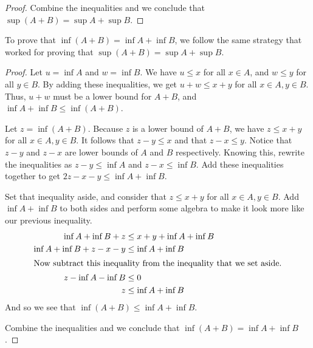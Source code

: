 \documentclass[12pt]{article}
\begin{document}
\begin{flushleft}
\begin{proof}
Combine the inequalities and we conclude that $\sup\left(A + B\right) = \sup A + \sup B$.
\end{proof}

To prove that $\inf\left(A + B\right) = \inf A + \inf B$, we follow the same strategy that worked for proving that $\sup\left(A + B\right) = \sup A + \sup B$.

\begin{proof}
Let $u = \inf A$ and $w = \inf B$. We have $u \leq x$ for all $x \in A$, and $w \leq y$ for all $y \in B$. By adding these inequalities, we get $u + w \leq x + y$ for all $x \in A, y \in B$. Thus, $u + w$ must be a lower bound for $A + B$, and $\inf A + \inf B \leq \inf\left(A + B\right)$.

Let $z = \inf\left(A + B\right)$. Because $z$ is a lower bound of $A + B$, we have $z \leq x + y$ for all $x \in A, y \in B$. It follows that $z - y \leq x$ and that $z - x \leq y$. Notice that $z - y$ and $z - x$ are lower bounds of $A$ and $B$ respectively. Knowing this, rewrite the inequalities as $z - y \leq \inf A$ and $z - x \leq \inf B$. Add these inequalities together to get $2 z - x - y \leq \inf A + \inf B$.

Set that inequality aside, and consider that $z \leq x + y$ for all $x \in A, y \in B$. Add $\inf A + \inf B$ to both sides and perform some algebra to make it look more like our previous inequality.
\begin{align*}
\inf A + \inf B + z &\leq x + y + \inf A + \inf B\\
\inf A + \inf B + z - x - y &\leq \inf A + \inf B\\
\intertext{Now subtract this inequality from the inequality that we set aside.}
z - \inf A - \inf B &\leq 0\\
z &\leq \inf A + \inf B
\end{align*}
And so we see that $\inf\left(A + B\right) \leq \inf A + \inf B$.

Combine the inequalities and we conclude that $\inf\left(A + B\right) = \inf A + \inf B$.
\end{proof}
\end{flushleft}
\end{document}

